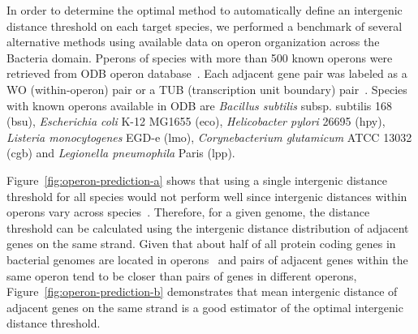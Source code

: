 In order to determine the optimal method to automatically define an intergenic
distance threshold on each target species, we performed a benchmark of several
alternative methods using available data on operon organization across the
Bacteria domain. Pperons of species with more than 500 known operons were
retrieved from ODB operon database~\cite{okuda2006odb}. Each adjacent gene pair
was labeled as a WO (within-operon) pair or a TUB (transcription unit boundary)
pair~\cite{chen2004computational}. Species with known operons available in ODB
are \textit{Bacillus subtilis} subsp. subtilis 168 (bsu), \textit{Escherichia
  coli} K-12 MG1655 (eco), \textit{Helicobacter pylori} 26695 (hpy),
\textit{Listeria monocytogenes} EGD-e (lmo), \textit{Corynebacterium
  glutamicum} ATCC 13032 (cgb) and \textit{Legionella pneumophila} Paris (lpp).

Figure~\ref{fig:operon-prediction-a} shows that using a single intergenic
distance threshold for all species would not perform well since intergenic
distances within operons vary across
species~\cite{rogozin2002congruent}. Therefore, for a given genome, the
distance threshold can be calculated using the intergenic distance distribution
of adjacent genes on the same strand. Given that about half of all protein
coding genes in bacterial genomes are located in operons~\cite{price2006life} and pairs
of adjacent genes within the same operon tend to be closer than pairs of genes
in different operons, Figure~\ref{fig:operon-prediction-b} demonstrates that
mean intergenic distance of adjacent genes on the same strand is a good
estimator of the optimal intergenic distance threshold.

